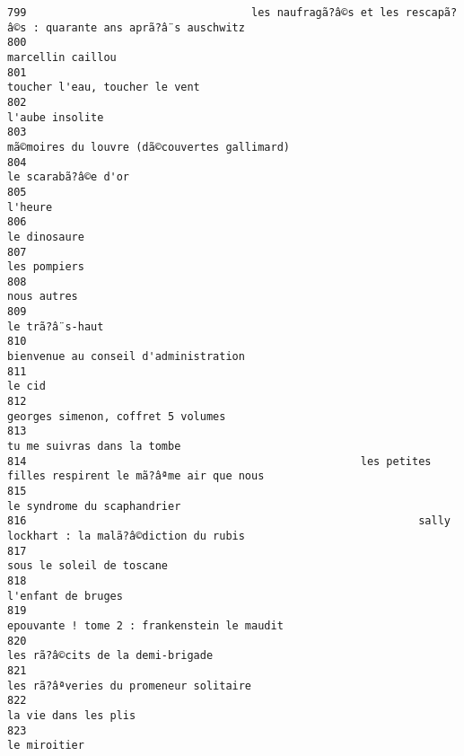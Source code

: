 \documentclass[
]{report}
\begin{document}
\begin{verbatim}
799                                   les naufragã?â©s et les rescapã?â©s : quarante ans aprã?â¨s auschwitz
800                                                                                       marcellin caillou
801                                                                          toucher l'eau, toucher le vent
802                                                                                         l'aube insolite
803                                                            mã©moires du louvre (dã©couvertes gallimard)
804                                                                                     le scarabã?â©e d'or
805                                                                                                 l'heure
806                                                                                            le dinosaure
807                                                                                            les pompiers
808                                                                                             nous autres
809                                                                                         le trã?â¨s-haut
810                                                                   bienvenue au conseil d'administration
811                                                                                                  le cid
812                                                                      georges simenon, coffret 5 volumes
813                                                                             tu me suivras dans la tombe
814                                                    les petites filles respirent le mã?âªme air que nous
815                                                                             le syndrome du scaphandrier
816                                                             sally lockhart : la malã?â©diction du rubis
817                                                                               sous le soleil de toscane
818                                                                                      l'enfant de bruges
819                                                             epouvante ! tome 2 : frankenstein le maudit
820                                                                        les rã?â©cits de la demi-brigade
821                                                                  les rã?âªveries du promeneur solitaire
822                                                                                    la vie dans les plis
823                                                                                            le miroitier

\end{verbatim}
\end{document}
